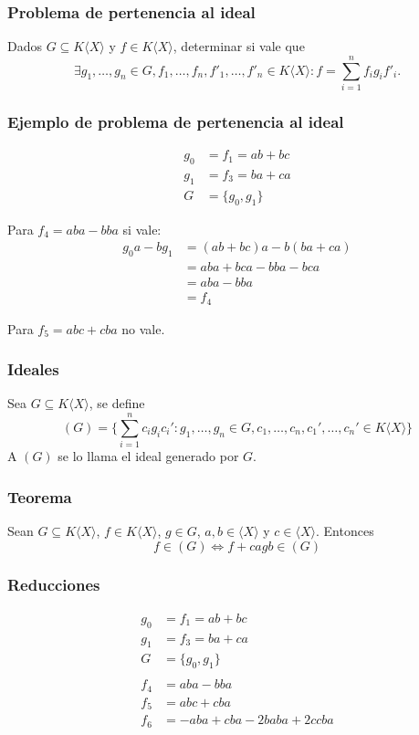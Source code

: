 \documentclass[spanish, aspectratio=169]{beamer}
\begin{document}
\begin{frame}
  \frametitle{Problema de pertenencia al ideal}
  Dados $G ⊆ K⟨X⟩$ y $f ∈ K⟨X⟩$, determinar si vale que
  \[ ∃g_1, …, g_n ∈ G, f_1, …, f_n, f'_1, …, f'_n ∈ K⟨X⟩ : f = ∑_{i = 1}^n f_i g_i f'_i \text{.}\]
\end{frame}

\begin{frame}
  \frametitle{Ejemplo de problema de pertenencia al ideal}
  \begin{align*}
    g_0 &= f_1 = ab + bc \\
    g_1 &= f_3 = ba + ca \\
    G &= \{g_0, g_1\}
  \end{align*}

  Para $f_4 = aba - bba$ si vale:
  \begin{align*}
    g_0 a - b g_1 &= (ab + bc)a - b(ba + ca) \\
      &= aba + bca - bba - bca \\
      &= aba - bba \\
      &= f_4
  \end{align*}

  Para $f_5 = abc + cba$ no vale.

\end{frame}

\begin{frame}
  \frametitle{Ideales}
  Sea $G ⊆ K⟨X⟩$, se define
  \[ (G) = \{∑_{i = 1}^n c_i g_i c_i' : g_1, …, g_n ∈ G, c_1, …, c_n, c_1', …, c_n' ∈ K⟨X⟩\} \]
  A $(G)$ se lo llama el ideal generado por $G$.
\end{frame}

\begin{frame}
  \frametitle{Teorema}
  Sean $G ⊆ K⟨X⟩$, $f ∈ K⟨X⟩$, $g ∈ G$, $a, b ∈ ⟨X⟩$ y $c ∈ ⟨X⟩$. Entonces
  \[ f ∈ (G) ⇔ f + c a g b ∈ (G) \]
\end{frame}


\begin{frame}
  \frametitle{Reducciones}
  \begin{align*}
    g_0 &= f_1 = ab + bc \\
    g_1 &= f_3 = ba + ca \\
    G &= \{g_0, g_1\} \\
    & \\
    f_4 &= aba - bba \\
    f_5 &= abc + cba \\
    f_6 &= -aba + cba - 2 baba + 2 ccba
  \end{align*}
\end{frame}
\end{document}
